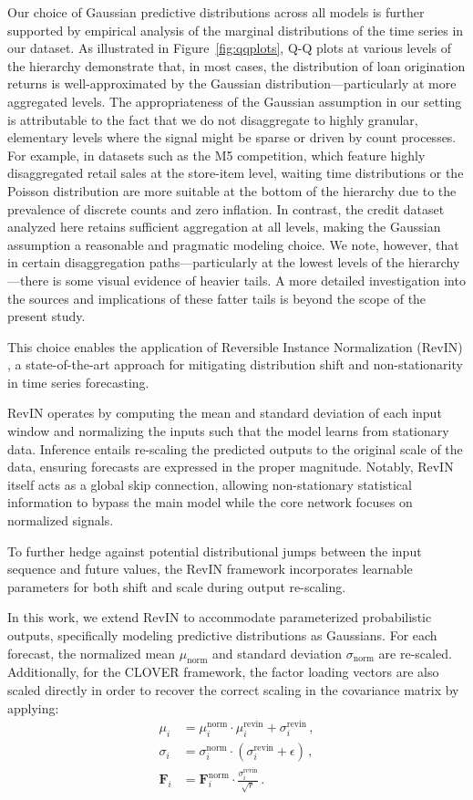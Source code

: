 \documentclass[letterpaper]{article}
\begin{document}
Our choice of Gaussian predictive distributions across all models is further supported by empirical analysis of the marginal distributions of the time series in our dataset. 
As illustrated in Figure~\ref{fig:qqplots}, Q-Q plots at various levels of the hierarchy demonstrate that, in most cases, the distribution of loan origination returns is well-approximated by the Gaussian distribution—particularly at more aggregated levels. 
The appropriateness of the Gaussian assumption in our setting is attributable to the fact that we do not disaggregate to highly granular, elementary levels where the signal might be sparse or driven by count processes. 
For example, in datasets such as the M5 competition, which feature highly disaggregated retail sales at the store-item level, waiting time distributions or the Poisson distribution are more suitable at the bottom of the hierarchy due to the prevalence of discrete counts and zero inflation. 
In contrast, the credit dataset analyzed here retains sufficient aggregation at all levels, making the Gaussian assumption a reasonable and pragmatic modeling choice.  
We note, however, that in certain disaggregation paths—particularly at the lowest levels of the hierarchy—there is some visual evidence of heavier tails. 
A more detailed investigation into the sources and implications of these fatter tails is beyond the scope of the present study.

This choice enables the application of Reversible Instance Normalization (RevIN) \cite{revin}, a state-of-the-art approach for mitigating distribution shift and non-stationarity in time series forecasting.

RevIN operates by computing the mean and standard deviation of each input window and normalizing the inputs such that the model learns from stationary data. 
Inference entails re-scaling the predicted outputs to the original scale of the data, ensuring forecasts are expressed in the proper magnitude. 
Notably, RevIN itself acts as a global skip connection, allowing non-stationary statistical information to bypass the main model while the core network focuses on normalized signals.

To further hedge against potential distributional jumps between the input sequence and future values, 
the RevIN framework incorporates learnable parameters for both shift and scale during output re-scaling.

In this work, we extend RevIN to accommodate parameterized probabilistic outputs, specifically modeling predictive distributions as Gaussians. 
For each forecast, the normalized mean $\mu_{\text{norm}}$ and standard deviation $\sigma_{\text{norm}}$ are re-scaled. 
Additionally, for the CLOVER framework, the factor loading vectors are also scaled directly in order to recover the correct scaling in the covariance matrix by applying: 
\begin{align*}
    \mu_i &= \mu_{i}^\text{norm} \cdot \mu_i^\text{revin} + \sigma_i^\text{revin}  \,,\\
    \sigma_i &= \sigma_{i}^\text{norm} \cdot (\sigma_i^\text{revin}+ \epsilon) \,, \\
    \mathbf{F}_{i} &= \mathbf{F}^\text{norm}_i \cdot \frac{\sigma_i^\text{revin}}{\sqrt{r}}\,.
\end{align*}
\end{document}
